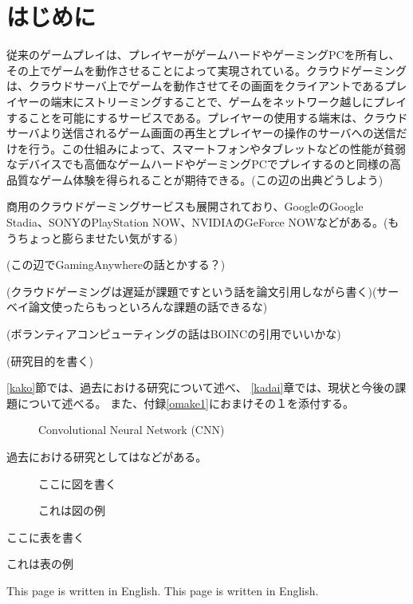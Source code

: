 \section{はじめに}

 従来のゲームプレイは、プレイヤーがゲームハードやゲーミングPCを所有し、その上でゲームを動作させることによって実現されている。クラウドゲーミングは、クラウドサーバ上でゲームを動作させてその画面をクライアントであるプレイヤーの端末にストリーミングすることで、ゲームをネットワーク越しにプレイすることを可能にするサービスである。プレイヤーの使用する端末は、クラウドサーバより送信されるゲーム画面の再生とプレイヤーの操作のサーバへの送信だけを行う。この仕組みによって、スマートフォンやタブレットなどの性能が貧弱なデバイスでも高価なゲームハードやゲーミングPCでプレイするのと同様の高品質なゲーム体験を得られることが期待できる。(この辺の出典どうしよう)

 商用のクラウドゲーミングサービスも展開されており、GoogleのGoogle Stadia、SONYのPlayStation NOW、NVIDIAのGeForce NOWなどがある。(もうちょっと膨らませたい気がする)

 (この辺でGamingAnywhereの話とかする？)

(クラウドゲーミングは遅延が課題ですという話を論文引用しながら書く)(サーベイ論文使ったらもっといろんな課題の話できるな)

(ボランティアコンピューティングの話はBOINCの引用でいいかな)

(研究目的を書く)

\ref{kako}節では、過去における研究について述べ、
\ref{kadai}章では、現状と今後の課題について述べる。
また、付録\ref{omake1}におまけその１を添付する。

\begin{figure*}[t]
 \centering
 \caption{Convolutional Neural Network (CNN)}
 \label{fig:CNN}
\end{figure*}

過去における研究としては\cite{alex_nips12}などがある。

\begin{figure}
\centerline{ここに図を書く}
\caption{これは図の例}
\end{figure}

\begin{table}
\centerline{ここに表を書く}
\caption{これは表の例}
\end{table}


\newpage

This page is written in English. This page is written in English. 
